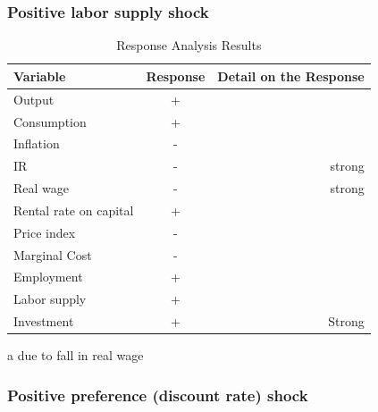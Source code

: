 \documentclass{article}
\begin{document}
\subsubsection{Positive labor supply shock}
\begin{table}[H]    
    \centering  
    \begin{threeparttable}    
    \caption{Response Analysis Results}    
    \label{tab:response_analysis}    
    \begin{tabular}{lcr}    
        \toprule    
        \textbf{Variable} & \textbf{Response} & \textbf{Detail on the Response} \\    
        \midrule    
        Output & + &  \\    
        Consumption & + &  \\  
        Inflation \tnote{a} & - &\\  
        IR & - & strong\\  
        Real wage & - & strong \\  
        Rental rate on capital & + & \\
        Price index & - & \\
        Marginal Cost \tnote{a} & - & \\
        Employment & + &  \\    
        Labor supply & + & \\
        Investment & + & Strong \\ 
        \bottomrule    
    \end{tabular}  
    \begin{tablenotes}  
        \small  
        \item[a] due to fall in real wage 
    \end{tablenotes}  
    \end{threeparttable}    
\end{table} 

\subsubsection{Positive preference (discount rate) shock}
\end{document}
